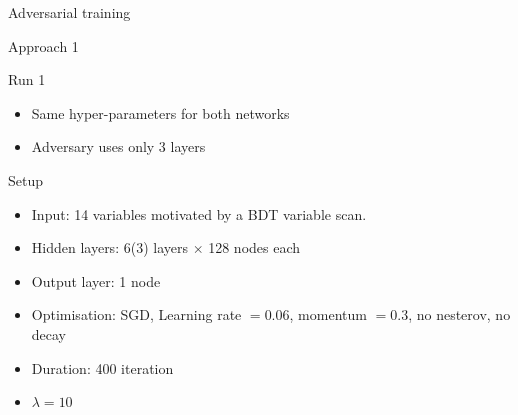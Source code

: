 \begin{frame}[c]
\begin{center}
\Huge Adversarial training
\end{center}
\end{frame}

\begin{frame}{Approach 1}
    \begin{block}{Run 1}
\begin{itemize}
    \item Same hyper-parameters for both networks
    \item Adversary uses only 3 layers
\end{itemize}
    \end{block}
    \begin{block}{Setup}
    \begin{itemize}
    \item Input: \num{14} variables motivated by a BDT variable scan.
    \item Hidden layers: \num{6}(\num{3}) \ELU layers $\times$ \num{128} nodes each
    \item Output layer: \num{1} \SIGMOID node
    \item Optimisation: SGD, Learning rate $=0.06$, momentum $=0.3$, no nesterov, no decay
    \item Duration: 400 iteration
    \item $\lambda = 10$
    \end{itemize}
    \end{block}
\end{frame}

